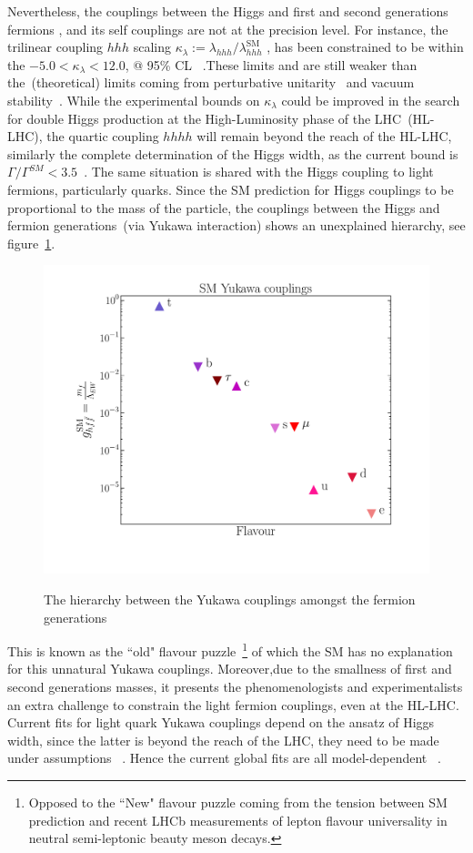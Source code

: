 \documentclass[12pt]{article}
\newcommand{\SM}{\text{SM}}
\begin{document}
\par Nevertheless, the couplings between the Higgs and first and second generations fermions , and its self couplings are not at the precision level. For instance, the trilinear coupling $ hhh$ scaling $\kappa_\lambda := \lambda_{hhh}/\lambda_{hhh}^{\SM}$ , has been constrained to be within the  $-5.0<\kappa_\lambda< 12.0 $, @ 95\% CL~\cite{Aad:2019uzh} .These limits and are still weaker than the~(theoretical) limits coming from perturbative unitarity~\cite{DiLuzio:2017tfn} and vacuum stability~\cite{Falkowski:2019tft}. While  the experimental bounds on $\kappa_\lambda$ could be improved in the search for double Higgs production at the High-Luminosity phase of the LHC~(HL-LHC),  the quartic coupling $hhhh$ will remain beyond the reach of the HL-LHC, similarly the complete determination of the Higgs width, as the current bound is $\Gamma/\Gamma^{SM }< 3.5$~\cite{CMS-PAS-HIG-18-002,Aaboud:2019rtt}.  The same situation is shared with the Higgs coupling to light fermions, particularly quarks. Since the SM prediction for Higgs couplings to be proportional to the mass of the particle, the couplings between the Higgs and fermion generations~(via Yukawa interaction) shows an unexplained hierarchy, see figure~\ref{yuk}.
\begin{figure}[!htbp]
	\centering
	\includegraphics[scale=0.35]{yukawa}
	\label{yuk}
	\caption{The hierarchy between the Yukawa couplings amongst the fermion generations}
\end{figure}
%
This is known as the ``old" flavour puzzle~\footnote{Opposed to the ``New" flavour puzzle coming from the tension between SM prediction and recent LHCb measurements of lepton flavour universality in neutral semi-leptonic beauty meson decays. } of which the SM has no explanation for this unnatural Yukawa couplings. Moreover,due to the smallness of first and second generations masses, it presents the phenomenologists and experimentalists an extra challenge to constrain the light fermion couplings, even at the HL-LHC.  Current fits for  light quark Yukawa couplings depend on the ansatz of Higgs width, since the latter is beyond the reach of the LHC, they need to be made under assumptions~ \cite{Englert:2014aca,Caola:2013yja,Aaboud:2018puo, Sirunyan:2019twz}. Hence the current global fits are all model-dependent~\cite{deBlas:2019rxi} . 
\end{document}
